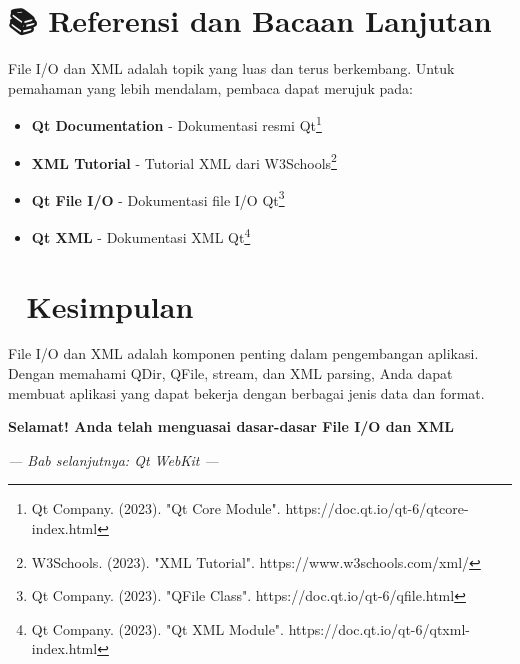 \section{📚 Referensi dan Bacaan Lanjutan}

File I/O dan XML adalah topik yang luas dan terus berkembang. Untuk pemahaman yang lebih mendalam, pembaca dapat merujuk pada:

\begin{itemize}
\item \textbf{Qt Documentation} - Dokumentasi resmi Qt\footnote{Qt Company. (2023). "Qt Core Module". https://doc.qt.io/qt-6/qtcore-index.html}
\item \textbf{XML Tutorial} - Tutorial XML dari W3Schools\footnote{W3Schools. (2023). "XML Tutorial". https://www.w3schools.com/xml/}
\item \textbf{Qt File I/O} - Dokumentasi file I/O Qt\footnote{Qt Company. (2023). "QFile Class". https://doc.qt.io/qt-6/qfile.html}
\item \textbf{Qt XML} - Dokumentasi XML Qt\footnote{Qt Company. (2023). "Qt XML Module". https://doc.qt.io/qt-6/qtxml-index.html}
\end{itemize}

\section{🎉 Kesimpulan}

File I/O dan XML adalah komponen penting dalam pengembangan aplikasi. Dengan memahami QDir, QFile, stream, dan XML parsing, Anda dapat membuat aplikasi yang dapat bekerja dengan berbagai jenis data dan format.

\begin{center}
\textbf{Selamat! Anda telah menguasai dasar-dasar File I/O dan XML} 📄
\end{center}

\vspace{1cm}

\begin{center}
\textit{--- Bab selanjutnya: Qt WebKit ---}
\end{center}

